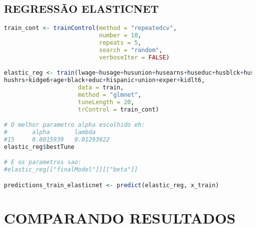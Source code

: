 \subsection*{REGRESSÃO ELASTICNET}
\begin{lstlisting}[language=R, style=input]
train_cont <- trainControl(method = "repeatedcv",
                           number = 10,
                           repeats = 5,
                           search = "random",
                           verboseIter = FALSE)

elastic_reg <- train(lwage~husage+husunion+husearns+huseduc+husblck+hushisp+
hushrs+kidge6+age+black+educ+hispanic+union+exper+kidlt6,
                     data = train,
                     method = "glmnet",
                     tuneLength = 20,
                     trControl = train_cont)

# O melhor parametro alpha escolhido eh:
#       alpha       lambda
#15     0.8015939   0.01293922
elastic_reg$bestTune

# E os parametros sao:
#elastic_reg[["finalModel"]][["beta"]]

predictions_train_elasticnet <- predict(elastic_reg, x_train)
\end{lstlisting}

\section*{COMPARANDO RESULTADOS}

